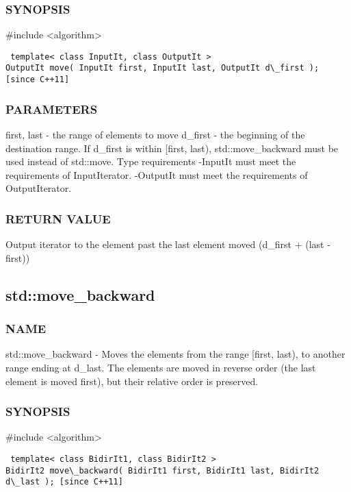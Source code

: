 \subsubsection{SYNOPSIS}
\#include <algorithm>

\begin{lstlisting}
 template< class InputIt, class OutputIt >
OutputIt move( InputIt first, InputIt last, OutputIt d\_first ); [since C++11]
\end{lstlisting}

\subsubsection{PARAMETERS}
first, last - the range of elements to move
d\_first - the beginning of the destination range. If d\_first is within [first, last), std::move\_backward must be used instead of  std::move.
 Type requirements
 -InputIt must meet the requirements of InputIterator.
 -OutputIt must meet the requirements of OutputIterator.

\subsubsection{RETURN VALUE}
Output iterator to the element past the last element moved (d\_first + (last - first))



\subsection{std::move\_backward}

\subsubsection{NAME}
std::move\_backward - Moves the elements from the range [first, last), to another range ending at d\_last. The elements are moved in reverse order (the last element is moved first), but their relative order is preserved.

\subsubsection{SYNOPSIS}
\#include <algorithm>

\begin{lstlisting}
 template< class BidirIt1, class BidirIt2 >
BidirIt2 move\_backward( BidirIt1 first, BidirIt1 last, BidirIt2 d\_last ); [since C++11]
\end{lstlisting}

